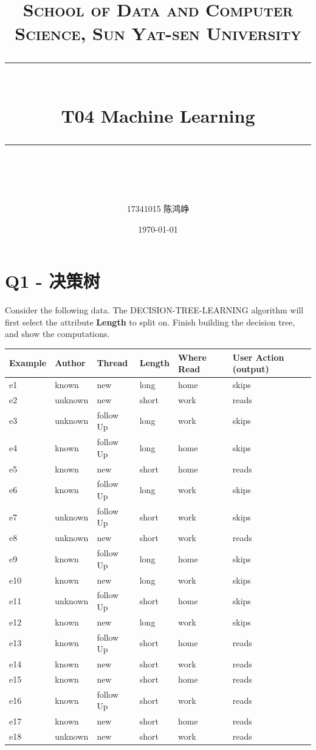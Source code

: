 \documentclass[a4paper, 11pt]{article}
\title{
\normalfont \normalsize
\textsc{School of Data and Computer Science, Sun Yat-sen University} \\ [25pt] %
\rule{\textwidth}{0.5pt} \\[0.4cm] %
\huge  T04 Machine Learning\\ %
\rule{\textwidth}{2pt} \\[0.5cm] %
\author{17341015 陈鸿峥}
\date{\normalsize\today}
}
\begin{document}
\maketitle
\tableofcontents
\newpage

\begin{flushleft}
\end{flushleft}

\section{Q1 - 决策树}
\begin{question}\normalfont
Consider the following data. The DECISION-TREE-LEARNING algorithm will first select the attribute \textbf{Length} to split on. Finish building the decision tree, and show the computations.
\begin{center}
\begin{tabular}{|l|l|l|l|l|l|}\hline
    \textbf{Example} & \textbf{Author} & \textbf{Thread} & \textbf{Length} & \textbf{Where Read} & \textbf{User Action (output)}\\\hline
    e1 & known & new & long & home & skips\\\hline
    e2 & unknown & new & short & work & reads\\\hline
    e3 & unknown & follow Up & long & work & skips\\\hline
    e4 & known & follow Up & long & home & skips\\\hline
    e5 & known & new & short & home & reads\\\hline
    e6 & known & follow Up & long & work & skips\\\hline
    e7 & unknown & follow Up & short & work & skips\\\hline
    e8 & unknown & new & short & work & reads\\\hline
    e9 & known & follow Up & long & home & skips\\\hline
    e10 & known & new & long & work & skips\\\hline
    e11 & unknown & follow Up & short & home & skips\\\hline
    e12 & known & new & long & work & skips\\\hline
    e13 & known & follow Up & short & home & reads\\\hline
    e14 & known & new & short & work & reads\\\hline
    e15 & known & new & short & home & reads\\\hline
    e16 & known & follow Up & short & work & reads\\\hline
    e17 & known & new & short & home & reads\\\hline
    e18 & unknown & new & short & work & reads\\\hline
\end{tabular}
\end{center}
\end{question}
\end{document}
